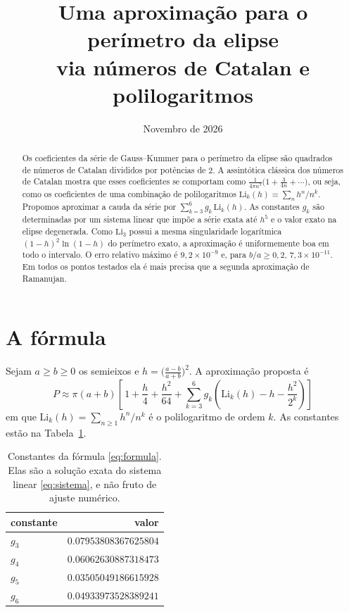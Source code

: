 \documentclass[11pt,a4paper]{article}
\title{Uma aproximação para o perímetro da elipse\\ via números de Catalan e polilogaritmos}
\author{}
\date{Novembro de 2026}
\theoremstyle{remark}
\begin{document}
\maketitle

\begin{abstract}
Os coeficientes da série de Gauss--Kummer para o perímetro da elipse são
quadrados de números de Catalan divididos por potências de 2. A assintótica clássica
dos números de Catalan mostra que esses coeficientes se comportam como
$\frac{1}{4\pi n^3}\big(1+\frac{3}{4n}+\cdots\big)$, ou seja, como os
coeficientes de uma combinação de polilogaritmos
$\mathrm{Li}_k(h)=\sum_n h^n/n^k$. Propomos aproximar a cauda da série por
$\sum_{k=3}^{6}g_k\,\mathrm{Li}_k(h)$. As constantes $g_k$ são determinadas por
um sistema linear que impõe a série exata até $h^5$ e o valor exato na elipse
degenerada. Como $\mathrm{Li}_3$ possui a mesma singularidade logarítmica
$(1-h)^2\ln(1-h)$ do perímetro exato, a aproximação é uniformemente boa em
todo o intervalo. O erro relativo máximo é $9{,}2\times10^{-9}$ e, para
$b/a\ge0{,}2$, $7{,}3\times10^{-11}$. Em todos os pontos testados ela é mais
precisa que a segunda aproximação de Ramanujan.
\end{abstract}

\section{A fórmula}

Sejam $a\ge b\ge0$ os semieixos e $h=\big(\frac{a-b}{a+b}\big)^2$. A aproximação proposta é
\begin{equation}\label{eq:formula}
\boxed{\;
P\approx\pi(a+b)\left[\,1+\frac h4+\frac{h^2}{64}
+\sum_{k=3}^{6}g_k\left(\mathrm{Li}_k(h)-h-\frac{h^2}{2^k}\right)\right]
\;}
\end{equation}
em que $\mathrm{Li}_k(h)=\sum_{n\ge1}h^n/n^k$ é o polilogaritmo de ordem $k$. As
constantes estão na Tabela~\ref{tab:g}.

\begin{table}[H]
\centering
\begin{tabular}{lr}
\toprule
constante & valor\\
\midrule
$g_3$ & $0.07953808367625804$\\
$g_4$ & $0.06062630887318473$\\
$g_5$ & $0.03505049186615928$\\
$g_6$ & $0.04933973528389241$\\
\bottomrule
\end{tabular}
\caption{Constantes da fórmula \eqref{eq:formula}. Elas são a solução exata do
sistema linear \eqref{eq:sistema}, e não fruto de ajuste numérico.}
\label{tab:g}
\end{table}
\end{document}
